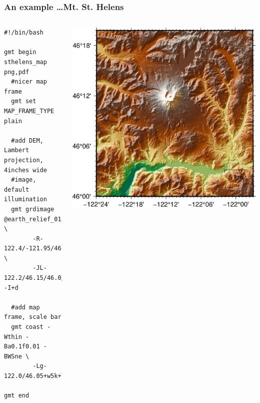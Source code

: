\documentclass[unknownkeysallowed]{beamer}
\begin{document}
\begin{frame}[fragile=singleslide]
\frametitle{An example \dots Mt. St. Helens}
	\begin{columns}
		\tiny{
		\begin{verbatim}
#!/bin/bash

gmt begin sthelens_map png,pdf
  #nicer map frame
  gmt set MAP_FRAME_TYPE plain

  #add DEM, Lambert projection, 4inches wide 
  #image, default illumination
  gmt grdimage @earth_relief_01s \
        -R-122.4/-121.95/46.0/46.33 \
        -JL-122.2/46.15/46.0/46.3/4i -I+d

  #add map frame, scale bar
  gmt coast -Wthin -Ba0.1f0.01 -BWSne \
        -Lg-122.0/46.05+w5k+l+c46.1

gmt end		
		\end{verbatim}
}
		\begin{center}
				\includegraphics[width=\textwidth]{../figures/gmt_sthelens_map_03.png}	
		\end{center}
	\end{columns}
\end{frame}
\end{document}
